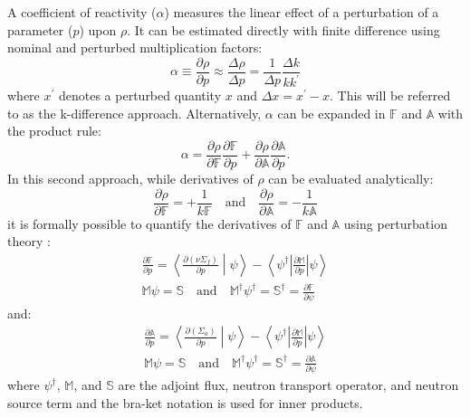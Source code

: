 \documentclass[11pt]{article}
\newcommand{\A}[0]{\mathbb{A}}
\newcommand{\F}[0]{\mathbb{F}}
\newcommand{\M}[0]{\mathbb{M}}
\newcommand{\SRC}[0]{\mathbb{S}}
\newcommand{\braket}[2]{\left<#1\middle|#2\right>}
\newcommand{\brabiket}[3]{\left<{#1\left|#2\right|#3}\right>}
\begin{document}
A coefficient of reactivity ($\alpha$) measures the linear effect of a perturbation of a parameter ($p$) upon $\rho$.
It can be estimated directly with finite difference using nominal and perturbed multiplication factors:
\begin{equation}
    \alpha \equiv \frac{\partial\rho}{\partial p}
    \approx \frac{\Delta \rho}{\Delta p}
    = \frac{1}{\Delta p} \frac{\Delta k}{k k^\prime}
    \label{eqn:kdiff}
\end{equation}
where $x^\prime$ denotes a perturbed quantity $x$ and $\Delta x = x^\prime - x$.
This will be referred to as the k-difference approach.
Alternatively, $\alpha$ can be expanded in $\F$ and $\A$ with the product rule:
\begin{equation}
    \alpha = \frac{\partial\rho}{\partial\F} \frac{\partial\F}{\partial p} + \frac{\partial\rho}{\partial\A} \frac{\partial\A}{\partial p}.
\end{equation}
In this second approach, while derivatives of $\rho$ can be evaluated analytically:
\begin{equation}
    \frac{\partial\rho}{\partial\F} = +\frac{1}{k\F} \quad \mathrm{and} \quad \frac{\partial\rho}{\partial\A} = -\frac{1}{k\A}
    \label{eqn:rhoAnal}
\end{equation}
it is formally possible to quantify the derivatives of $\F$ and $\A$ using perturbation theory \cite{greenspan1976dpt}:
\begin{equation}
    \begin{split}
    \frac{\partial\F}{\partial p} = \braket{\frac{\partial(\nu\Sigma_f)}{\partial p}}{\psi} - \brabiket{\psi^\dagger}{\frac{\partial\M}{\partial p}}{\psi} \\
    \M\psi = \SRC \quad \mathrm{and} \quad \M^\dagger \psi^\dagger = \SRC^\dagger = \frac{\partial\F}{\partial\psi}
    \end{split}
    \label{eqn:pertF}
\end{equation}
and:
\begin{equation}
    \begin{split}
    \frac{\partial\A}{\partial p} = \braket{\frac{\partial(\Sigma_a)}{\partial p}}{\psi} - \brabiket{\psi^\dagger}{\frac{\partial\M}{\partial p}}{\psi} \\
    \M\psi = \SRC \quad \mathrm{and} \quad \M^\dagger \psi^\dagger = \SRC^\dagger = \frac{\partial\A}{\partial\psi}
    \end{split}
    \label{eqn:pertA}
\end{equation}
where $\psi^\dagger$, $\M$, and $\SRC$ are the adjoint flux, neutron transport operator, and neutron source term and the bra-ket notation is used for inner products.
\end{document}
